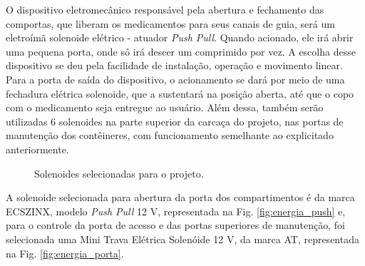 O dispositivo eletromecânico responsável pela abertura e fechamento das comportas, que liberam os medicamentos para seus canais de guia, será um eletroímã solenoide elétrico - atuador \textit{Push Pull}. Quando acionado, ele irá abrir uma pequena porta, onde só irá descer um comprimido por vez. A escolha desse dispositivo se deu pela facilidade de instalação, operação e movimento linear.
Para a porta de saída do dispositivo, o acionamento se dará por meio de uma fechadura elétrica solenoide, que a sustentará na posição aberta, até que o copo com o medicamento seja entregue ao usuário. Além dessa, também serão utilizadas 6 solenoides na parte superior da carcaça do projeto, nas portas de manutenção dos contêineres, com funcionamento semelhante ao explicitado anteriormente.

\begin{figure}[H]
\centering
{}
\qquad
{}
\caption{Solenoides selecionadas para o projeto.}
\end{figure}

A solenoide selecionada para abertura da porta dos compartimentos é da marca ECSZINX, modelo \textit{Push Pull} 12 V, representada na Fig. \ref{fig:energia_push} e, para o controle da porta de acesso e das portas superiores de manutenção, foi selecionada uma Mini Trava Elétrica Solenóide 12 V, da marca AT, representada na Fig. \ref{fig:energia_porta}.

